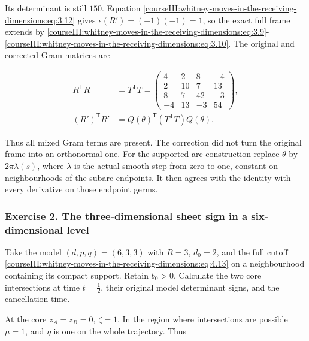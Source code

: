 Its determinant is still \(150\). Equation \eqref{courseIII:whitney-moves-in-the-receiving-dimensions:eq:3.12} gives
\(\epsilon(R')=(-1)(-1)=1\), so the exact full frame extends by \eqref{courseIII:whitney-moves-in-the-receiving-dimensions:eq:3.9}-\eqref{courseIII:whitney-moves-in-the-receiving-dimensions:eq:3.10}. The original and corrected Gram matrices are

\begin{equation}
\begin{aligned}
 R^{\mathsf T}R&=T^{\mathsf T}T=
 \begin{pmatrix}
 4&2&8&-4\\
 2&10&7&13\\
 8&7&42&-3\\
 -4&13&-3&54
 \end{pmatrix},\\
 (R')^{\mathsf T}R'&=Q(\theta)^{\mathsf T}
       (T^{\mathsf T}T)Q(\theta).
 \end{aligned}
 \label{courseIII:whitney-moves-in-the-receiving-dimensions:eq:5.3}
\end{equation}

Thus all mixed Gram terms are present. The correction did not turn the original frame into an orthonormal one. For the supported arc construction replace \(\theta\) by \(2\pi\lambda(s)\), where \(\lambda\) is the actual smooth step from zero to one, constant on neighbourhoods of the subarc endpoints. It then agrees with the identity with every derivative on those endpoint germs.

\subsubsection{Exercise 2. The three-dimensional sheet sign in a six-dimensional level}
\label{courseIII:whitney-moves-in-the-receiving-dimensions:exercise-2}

\label{courseIII:whitney-receiving:5.2}

Take the model \((d,p,q)=(6,3,3)\) with \(R=3\), \(d_0=2\), and the full cutoff \eqref{courseIII:whitney-moves-in-the-receiving-dimensions:eq:4.13} on a neighbourhood containing its compact support. Retain \(b_0>0\). Calculate the two core intersections at time \(t=\tfrac12\), their original model determinant signs, and the cancellation time.

At the core \(z_A=z_B=0\), \(\zeta=1\). In the region where intersections are possible \(\mu=1\), and \(\eta\) is one on the whole trajectory. Thus

